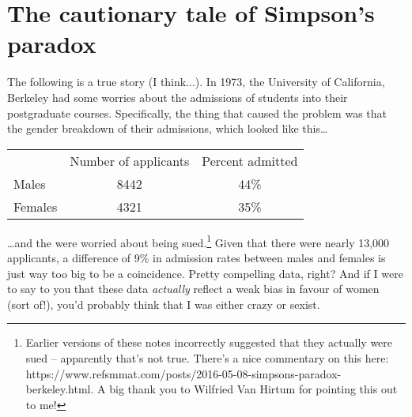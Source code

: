 \section{The cautionary tale of Simpson's paradox}



The following is a true story (I think...). In 1973, the University of California, Berkeley had some worries about the admissions of students into their postgraduate courses. Specifically, the thing that caused the problem was that the gender breakdown of their admissions, which looked like this\ldots
\begin{center}
\begin{tabular}{lcc}
& Number of applicants & Percent admitted \\
Males & 8442 & 44\% \\
Females & 4321 & 35\%  \\
\end{tabular}
\end{center}
\ldots and the were worried about being sued.\footnote{Earlier versions of these notes incorrectly suggested that they actually were sued -- apparently that's not true. There's a nice commentary on this here: https://www.refsmmat.com/posts/2016-05-08-simpsons-paradox-berkeley.html. A big thank you to Wilfried Van Hirtum for pointing this out to me!} Given that there were nearly 13,000 applicants, a difference of 9\% in admission rates between males and females is just way too big to be a coincidence. Pretty compelling data, right? And if I were to say to you that these data {\it actually} reflect a weak bias in favour of women (sort of!), you'd probably think that I was either crazy or sexist. 

